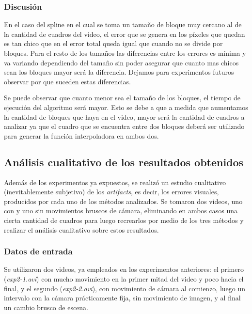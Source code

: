             \subsubsection*{Discusión}

            En el caso del spline en el cual se toma un tamaño de bloque muy cercano al de la cantidad de cuadros del video, el error que se genera en los píxeles que quedan es tan chico que en el error total queda igual que cuando no se divide por bloques. Para el resto de los tamaños las diferencias entre los errores es mínima y va variando dependiendo del tamaño sin poder asegurar que cuanto mas chicos sean los bloques mayor será la diferencia. Dejamos para experimentos futuros observar por que suceden estas diferencias.

            Se puede observar que cuanto menor sea el tamaño de los bloques, el tiempo de ejecución del algoritmo será mayor. Esto se debe a que a medida que aumentamos la cantidad de bloques que haya en el video, mayor será la cantidad de cuadros a analizar ya que el cuadro que se encuentra entre dos bloques deberá ser utilizado para generar la función interpoladora en ambos dos.

    \subsection{Análisis cualitativo de los resultados obtenidos}

            Además de los experimentos ya expuestos, se realizó un estudio cualitativo (inevitablemente subjetivo) de los \emph{artifacts}, es decir, los errores visuales, producidos por cada uno de los métodos analizados. Se tomaron dos videos, uno con y uno sin movimientos bruscos de cámara, eliminando en ambos casos una cierta cantidad de cuadros para luego recrearlos por medio de los tres métodos y realizar el análisis cualitativo sobre estos resultados.

            \subsubsection*{Datos de entrada}

                Se utilizaron dos videos, ya empleados en los experimentos anteriores: el primero (\emph{exp2-1.avi}) con mucho movimiento en la primer mitad del video y poco hacia el final, y el segundo (\emph{exp2-2.avi}), con movimiento de cámara al comienzo, luego un intervalo con la cámara prácticamente fija, sin movimiento de imagen, y al final un cambio brusco de escena.

